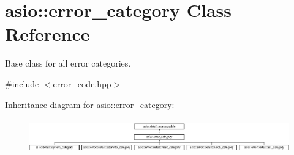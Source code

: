 \hypertarget{classasio_1_1error__category}{}\section{asio\+:\+:error\+\_\+category Class Reference}
\label{classasio_1_1error__category}


Base class for all error categories.  




{\ttfamily \#include $<$error\+\_\+code.\+hpp$>$}

Inheritance diagram for asio\+:\+:error\+\_\+category\+:\begin{figure}[H]
\begin{center}
\leavevmode
\includegraphics[height=1.500000cm]{classasio_1_1error__category}
\end{center}
\end{figure}

